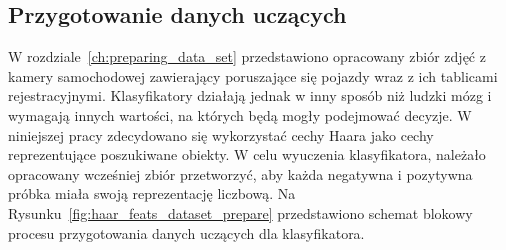 \subsection{Przygotowanie danych uczących}
\label{subsec:przygotowanie-danych-uczacych}
W rozdziale~\ref{ch:preparing_data_set} przedstawiono opracowany zbiór zdjęć z kamery samochodowej zawierający poruszające się pojazdy wraz z ich tablicami rejestracyjnymi.
Klasyfikatory działają jednak w inny sposób niż ludzki mózg i wymagają innych wartości, na których będą mogły podejmować decyzje.
W niniejszej pracy zdecydowano się wykorzystać cechy Haara jako cechy reprezentujące poszukiwane obiekty.
W celu wyuczenia klasyfikatora, należało opracowany wcześniej zbiór przetworzyć, aby każda negatywna i pozytywna próbka miała swoją reprezentację liczbową.
Na Rysunku~\ref{fig:haar_feats_dataset_prepare} przedstawiono schemat blokowy procesu przygotowania danych uczących dla klasyfikatora.
